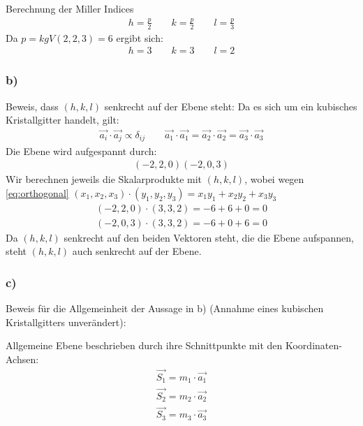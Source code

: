 \documentclass[11pt]{article}
\begin{document}
Berechnung der Miller Indices
\begin{align*}
h = \frac{p}{2}\qquad k = \frac{p}{2}\qquad l = \frac{p}{3}
\end{align*}
Da $p=kgV(2,2,3)=6$ ergibt sich:
\begin{align*}
h = 3\qquad k = 3\qquad l = 2
\end{align*}

\subsubsection*{b)}

Beweis, dass $(h,k,l)$ senkrecht auf der Ebene steht:
Da es sich um ein kubisches Kristallgitter handelt, gilt:
\begin{align}
\label{eq:orthogonal}
\vec{a_i}\cdot\vec{a_j}\propto \delta_{ij}\qquad
\vec{a_1}\cdot\vec{a_1}=\vec{a_2}\cdot\vec{a_2}=\vec{a_3}\cdot\vec{a_3}
\end{align}
Die Ebene wird aufgespannt durch:
\begin{align*}
(-2,2,0)
(-2,0,3)
\end{align*}
Wir berechnen jeweils die Skalarprodukte mit $(h,k,l)$, wobei wegen \eqref{eq:orthogonal} $(x_1,x_2,x_3)\cdot(y_1,y_2,y_3) = x_1y_1+x_2y_2+x_3y_3$
\begin{align*}
(-2,2,0)\cdot(3,3,2)=-6+6+0=0\\
(-2,0,3)\cdot(3,3,2)=-6+0+6=0
\end{align*}
Da $(h,k,l)$ senkrecht auf den beiden Vektoren steht, die die Ebene aufspannen, steht $(h,k,l)$ auch senkrecht auf der Ebene.

\subsubsection*{c)}

Beweis für die Allgemeinheit der Aussage in b) (Annahme eines kubischen Kristallgitters unverändert):

Allgemeine Ebene beschrieben durch ihre Schnittpunkte mit den Koordinaten- Achsen:
\begin{align*}
\vec{S_1} = m_1\cdot \vec{a_1} \\
\vec{S_2} = m_2\cdot\vec{a_2}\\
\vec{S_3} = m_3\cdot\vec{a_3}
\end{align*}
\end{document}
